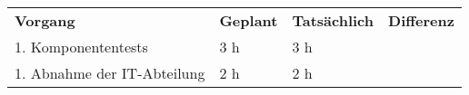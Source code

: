 \begin{tabular}{llll}
\rowcolor{heading}\textbf{Vorgang} & \textbf{Geplant} & \textbf{Tatsächlich} & \textbf{Differenz} \\
1. Komponententests & 3 h   & 3 h   &  \\
1. Abnahme der IT-Abteilung & 2 h   & 2 h   &  \\
\end{tabular}
